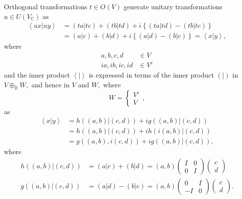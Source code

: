 \documentclass[aps,preprint]{revtex4}
\begin{document}
Orthogonal transformations $t\in O\left( V\right) $ generate unitary
transformations $u\in U\left( V_{\mathbb{C}}\right) $ as 
\begin{align}
\left\langle \left. ux\right\vert uy\right\rangle & =\left( \left.
ta\right\vert tc\right) +\left( \left. tb\right\vert td\right) +i\left\{
\left( \left. ta\right\vert td\right) -\left( \left. tb\right\vert tc\right)
\right\} \\
& =\left( \left. a\right\vert c\right) +\left( \left. b\right\vert d\right)
+i\left\{ \left( \left. a\right\vert d\right) -\left( \left. b\right\vert
c\right) \right\} =\left\langle \left. x\right\vert y\right\rangle ,
\end{align}
where 
\begin{align}
a,b,c,d & \in V \\
ia,ib,ic,id & \in V^{c}
\end{align}
and the inner product $\left\langle \left. {}\right\vert \right\rangle $ is
expressed in terms of the inner product $\left( \left. {}\right\vert \right) 
$ in $V\oplus_{\mathbb{R}}W,$ and hence in $V$ and $W,$ where 
\begin{equation}
W=\left\{ 
\begin{array}{c}
V^{c} \\ 
V%
\end{array}
\right. ,
\end{equation}
as 
\begin{align}
\left\langle \left. x\right\vert y\right\rangle & =h\left( \left. \left(
a,b\right) \right\vert \left( c,d\right) \right) +ig\left( \left. \left(
a,b\right) \right\vert \left( c,d\right) \right) \\
& =h\left( \left. \left( a,b\right) \right\vert \left( c,d\right) \right)
+ih\left( \left. i\left( a,b\right) \right\vert \left( c,d\right) \right) \\
& =g\left( \left( a,b\right) ,i\left( c,d\right) \right) +ig\left( \left.
\left( a,b\right) \right\vert \left( c,d\right) \right) ,
\end{align}
where 
\begin{align}
h\left( \left. \left( a,b\right) \right\vert \left( c,d\right) \right) &
=\left( \left. a\right\vert c\right) +\left( \left. b\right\vert d\right)
=\left( a,b\right) \left( 
\begin{array}{cc}
I & 0 \\ 
0 & I%
\end{array}
\right) \left( 
\begin{array}{c}
c \\ 
d%
\end{array}
\right) \\
g\left( \left. \left( a,b\right) \right\vert \left( c,d\right) \right) &
=\left( \left. a\right\vert d\right) -\left( \left. b\right\vert c\right)
=\left( a,b\right) \left( 
\begin{array}{cc}
0 & I \\ 
-I & 0%
\end{array}
\right) \left( 
\begin{array}{c}
c \\ 
d%
\end{array}
\right) .
\end{align}
\end{document}
